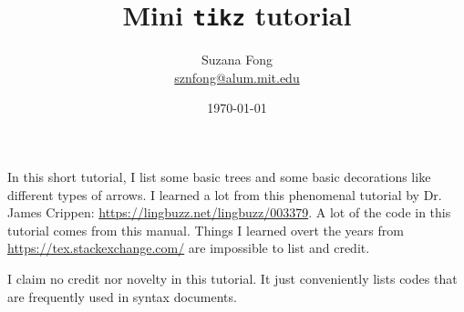 \documentclass[11pt]{article}
\begin{document}
\title{\textbf{Mini \texttt{tikz} tutorial}}
\author{Suzana Fong\\
\href{mailto:sznfong@alum.mit.edu}{sznfong@alum.mit.edu}}
\date{\today}
\maketitle

In this short tutorial, I list some basic trees and some basic decorations like different types of arrows. I learned a lot from this phenomenal tutorial by Dr. James Crippen: \url{https://lingbuzz.net/lingbuzz/003379}. A lot of the code in this tutorial comes from this manual. Things I learned overt the years from \url{https://tex.stackexchange.com/} are impossible to list and credit.

I claim no credit nor novelty in this tutorial. It just conveniently lists codes that are frequently used in syntax documents.
\end{document}

